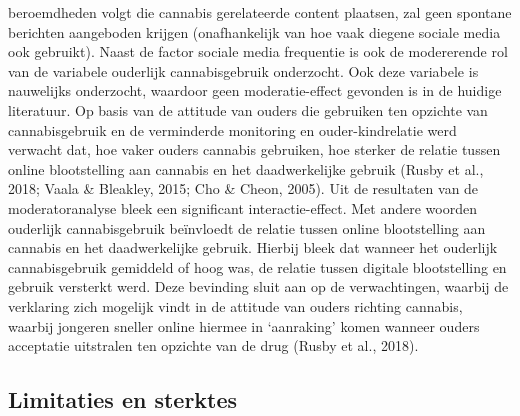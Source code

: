 \documentclass[
  letterpaper,
  DIV=11,
  numbers=noendperiod]{scrartcl}
\begin{document}
beroemdheden volgt die cannabis gerelateerde content plaatsen, zal geen
spontane berichten aangeboden krijgen (onafhankelijk van hoe vaak
diegene sociale media ook gebruikt). Naast de factor sociale media
frequentie is ook de modererende rol van de variabele ouderlijk
cannabisgebruik onderzocht. Ook deze variabele is nauwelijks onderzocht,
waardoor geen moderatie-effect gevonden is in de huidige literatuur. Op
basis van de attitude van ouders die gebruiken ten opzichte van
cannabisgebruik en de verminderde monitoring en ouder-kindrelatie werd
verwacht dat, hoe vaker ouders cannabis gebruiken, hoe sterker de
relatie tussen online blootstelling aan cannabis en het daadwerkelijke
gebruik (Rusby et al., 2018; Vaala \& Bleakley, 2015; Cho \& Cheon,
2005). Uit de resultaten van de moderatoranalyse bleek een significant
interactie-effect. Met andere woorden ouderlijk cannabisgebruik
beïnvloedt de relatie tussen online blootstelling aan cannabis en het
daadwerkelijke gebruik. Hierbij bleek dat wanneer het ouderlijk
cannabisgebruik gemiddeld of hoog was, de relatie tussen digitale
blootstelling en gebruik versterkt werd. Deze bevinding sluit aan op de
verwachtingen, waarbij de verklaring zich mogelijk vindt in de attitude
van ouders richting cannabis, waarbij jongeren sneller online hiermee in
`aanraking' komen wanneer ouders acceptatie uitstralen ten opzichte van
de drug (Rusby et al., 2018).

\hypertarget{limitaties-en-sterktes}{%
\subsection{Limitaties en sterktes}\label{limitaties-en-sterktes}}
\end{document}

